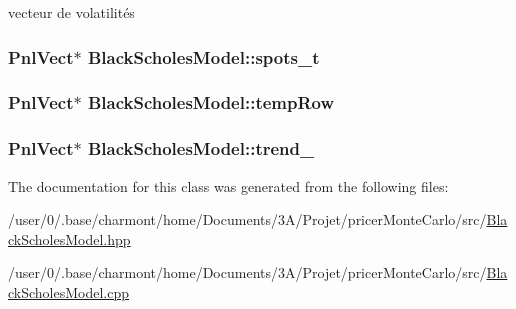 vecteur de volatilités 

\hypertarget{classBlackScholesModel_a18801c05f4b88b9cbf39fb48bd8beed4}{
\subsubsection[{spots\-\_\-t}]{\setlength{\rightskip}{0pt plus 5cm}Pnl\-Vect$\ast$ Black\-Scholes\-Model\-::spots\-\_\-t\hspace{0.3cm}{\ttfamily [private]}}}\label{classBlackScholesModel_a18801c05f4b88b9cbf39fb48bd8beed4}
\hypertarget{classBlackScholesModel_a28428fd6090bc1062d0ec7612feeaac0}{
\subsubsection[{temp\-Row}]{\setlength{\rightskip}{0pt plus 5cm}Pnl\-Vect$\ast$ Black\-Scholes\-Model\-::temp\-Row\hspace{0.3cm}{\ttfamily [private]}}}\label{classBlackScholesModel_a28428fd6090bc1062d0ec7612feeaac0}
\hypertarget{classBlackScholesModel_af92b535c61f17e7a16af56952739302f}{
\subsubsection[{trend\-\_\-}]{\setlength{\rightskip}{0pt plus 5cm}Pnl\-Vect$\ast$ Black\-Scholes\-Model\-::trend\-\_\-\hspace{0.3cm}{\ttfamily [protected]}}}\label{classBlackScholesModel_af92b535c61f17e7a16af56952739302f}


The documentation for this class was generated from the following files\-:\begin{DoxyCompactItemize}
\item 
/user/0/.\-base/charmont/home/\-Documents/3\-A/\-Projet/pricer\-Monte\-Carlo/src/\hyperlink{BlackScholesModel_8hpp}{Black\-Scholes\-Model.\-hpp}\item 
/user/0/.\-base/charmont/home/\-Documents/3\-A/\-Projet/pricer\-Monte\-Carlo/src/\hyperlink{BlackScholesModel_8cpp}{Black\-Scholes\-Model.\-cpp}\end{DoxyCompactItemize}
